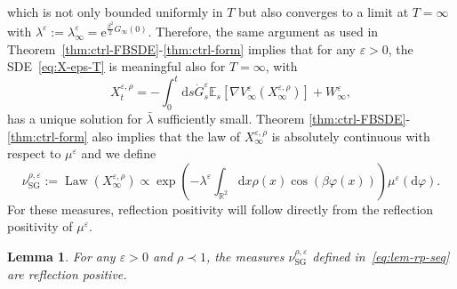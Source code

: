 \documentclass[11pt, a4paper]{scrartcl}
\numberwithin{equation}{section}
\theoremstyle{plain}
\newtheorem{lemma}[foo]{Lemma}
\theoremstyle{remark}
\newcommand{\assign}{:=}
\newcommand{\mathd}{\mathrm{d}}
\newcommand{\mathe}{\mathrm{e}}
\newcommand{\tmop}[1]{\ensuremath{\operatorname{#1}}}
\begin{document}
which is not only bounded uniformly in $T$ but also converges to a limit at $T
	= \infty$ with $\lambda^{\varepsilon} \assign \lambda_{\infty}^{\varepsilon} =
	\mathe^{\frac{\beta^2}{2} G_{\infty} (0)}$. Therefore, the same argument as
used in Theorem~\ref{thm:ctrl-FBSDE}-\ref{thm:ctrl-form} implies that for any
$\varepsilon > 0$, the SDE~\eqref{eq:X-eps-T} is meaningful also for $T =
	\infty$, with
\begin{equation}
	X^{\varepsilon, \rho}_t = - \int_0^t \mathd s \dot{G}_s^{\varepsilon} \mathbb{E}_s
	[\nabla V_{\infty}^{\varepsilon} (X^{\varepsilon, \rho}_{\infty})] +
	W_{\infty}^{\varepsilon}, \label{eq:SDE-V-RP}
\end{equation}
has a unique solution for $\bar{\lambda}$ sufficiently small. Theorem
\ref{thm:ctrl-FBSDE}-\ref{thm:ctrl-form} also implies that the law of
$X^{\varepsilon, \rho}_{\infty}$ is absolutely continuous with respect to
$\mu^{\varepsilon}$ and we define
\begin{equation}
	\nu_{\tmop{SG}}^{\rho, \varepsilon} \assign \tmop{Law}
	(X^{\varepsilon, \rho}_{\infty}) \propto \exp \left( - \lambda^{\varepsilon}
	\int_{\mathbb{R}^2} \mathd x \rho (x) \cos (\beta \varphi (x)) \right)
	\mu^{\varepsilon} (\mathd \varphi) . \label{eq:lem-rp-seq}
\end{equation}
For these measures, reflection positivity will follow directly from the
reflection positivity of $\mu^{\varepsilon}$.

\begin{lemma}
	For any $\varepsilon > 0$ and $\rho \prec 1$, the measures
	$\nu_{\tmop{SG}}^{\rho, \varepsilon}$ defined in~\eqref{eq:lem-rp-seq} are
	reflection positive.
\end{lemma}
\end{document}
